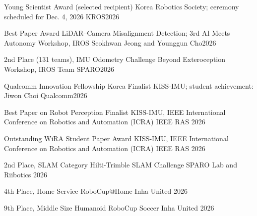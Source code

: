 
\begin{cvhonors}

  \cvhonor
    {Young Scientist Award (selected recipient)}
    {Korea Robotics Society; ceremony scheduled for Dec. 4, 2026}
    {KROS}{2026}

  \cvhonor
    {Best Paper Award}
    {LiDAR--Camera Misalignment Detection; 3rd AI Meets Autonomy Workshop, IROS}
    {Seokhwan Jeong and Younggun Cho}{2026}

  \cvhonor
    {2nd Place (131 teams), IMU Odometry Challenge}
    {Beyond Exteroception Workshop, IROS}
    {Team SPARO}{2026}

  \cvhonor
    {Qualcomm Innovation Fellowship Korea Finalist}
    {KISS-IMU; student achievement: Jiwon Choi}
    {Qualcomm}{2026}


  \cvhonor
    {Best Paper on Robot Perception Finalist} %
    {KISS-IMU, IEEE International Conference on Robotics and Automation (ICRA)} %
    {IEEE RAS} %
    {2026} %

  \cvhonor
    {Outstanding WiRA Student Paper Award} %
    {KISS-IMU, IEEE International Conference on Robotics and Automation (ICRA)} %
    {IEEE RAS} %
    {2026} %

  \cvhonor
    {2nd Place, SLAM Category} %
    {Hilti-Trimble SLAM Challenge} %
    {SPARO Lab and Riibotics} %
    {2026} %

  \cvhonor
    {4th Place, Home Service} %
    {RoboCup@Home} %
    {Inha United} %
    {2026} %

  \cvhonor
    {9th Place, Middle Size Humanoid} %
    {RoboCup Soccer} %
    {Inha United} %
    {2026} %


\end{cvhonors}
